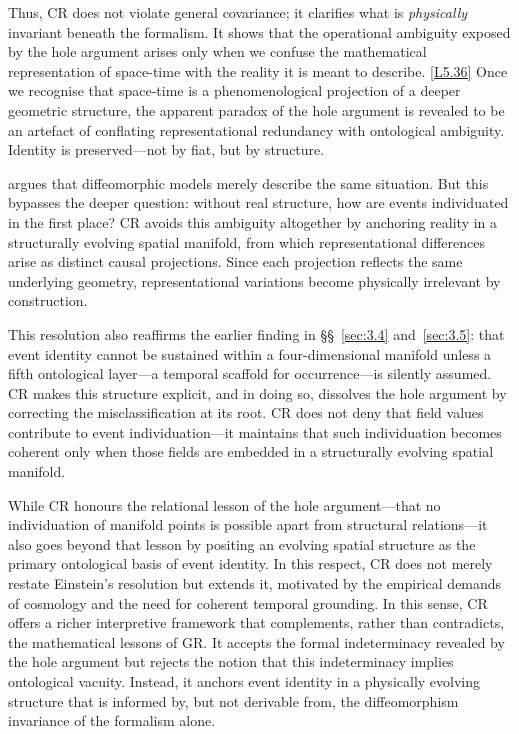 \documentclass[12pt]{book}
\newcounter{logicanchor}
\newenvironment{logicanchorenv}[1]{\refstepcounter{logicanchor}\label{#1}}{}
\newcommand{\logiclink}[2]{\begin{logicanchorenv}{logic:#1}\end{logicanchorenv}\hyperref[appendix:#1]{[#1]}\xspace}
\begin{document}
Thus, CR does not violate general covariance; it clarifies what is \emph{physically} invariant beneath the formalism. It shows that the operational ambiguity exposed by the hole argument arises only when we confuse the mathematical representation of space-time with the reality it is meant to describe. \logiclink{L5.36}{} Once we recognise that space-time is a phenomenological projection of a deeper geometric structure, the apparent paradox of the hole argument is revealed to be an artefact of conflating representational redundancy with ontological ambiguity. Identity is preserved---not by fiat, but by structure.

\citet{Weatherall2018} argues that diffeomorphic models merely describe the same situation. But this bypasses the deeper question: without real structure, how are events individuated in the first place? CR avoids this ambiguity altogether by anchoring reality in a structurally evolving spatial manifold, from which representational differences arise as distinct causal projections. Since each projection reflects the same underlying geometry, representational variations become physically irrelevant by construction.

This resolution also reaffirms the earlier finding in \S\S~\ref{sec:3.4} and~\ref{sec:3.5}: that event identity cannot be sustained within a four-dimensional manifold unless a fifth ontological layer---a temporal scaffold for occurrence---is silently assumed. CR makes this structure explicit, and in doing so, dissolves the hole argument by correcting the misclassification at its root. CR does not deny that field values contribute to event individuation---it maintains that such individuation becomes coherent only when those fields are embedded in a structurally evolving spatial manifold. 

While CR honours the relational lesson of the hole argument---that no individuation of manifold points is possible apart from structural relations---it also goes beyond that lesson by positing an evolving spatial structure as the primary ontological basis of event identity. In this respect, CR does not merely restate Einstein's resolution but extends it, motivated by the empirical demands of cosmology and the need for coherent temporal grounding. In this sense, CR offers a richer interpretive framework that complements, rather than contradicts, the mathematical lessons of GR. It accepts the formal indeterminacy revealed by the hole argument but rejects the notion that this indeterminacy implies ontological vacuity. Instead, it anchors event identity in a physically evolving structure that is informed by, but not derivable from, the diffeomorphism invariance of the formalism alone.
\end{document}
